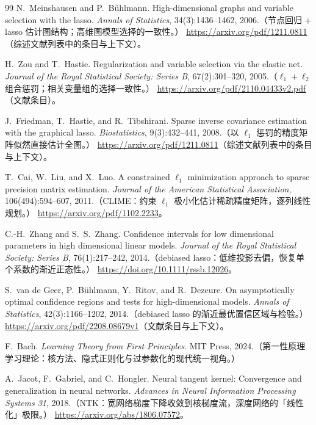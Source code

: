\documentclass[11pt, a4paper]{ctexart}
\theoremstyle{plain}
\theoremstyle{definition}
\theoremstyle{remark}
\begin{document}
\begin{thebibliography}{99}
N.~Meinshausen and P.~B\"uhlmann.
\newblock High-dimensional graphs and variable selection with the lasso.
\newblock \emph{Annals of Statistics}, 34(3):1436--1462, 2006.（节点回归 + lasso 估计图结构；高维图模型选择的一致性。）
\newblock \url{https://arxiv.org/pdf/1211.0811}（综述文献列表中的条目与上下文）。

H.~Zou and T.~Hastie.
\newblock Regularization and variable selection via the elastic net.
\newblock \emph{Journal of the Royal Statistical Society: Series B}, 67(2):301--320, 2005.（$\ell_1 + \ell_2$ 组合惩罚；相关变量组的选择一致性。）
\newblock \url{https://arxiv.org/pdf/2110.04433v2.pdf}（文献条目）。

J.~Friedman, T.~Hastie, and R.~Tibshirani.
\newblock Sparse inverse covariance estimation with the graphical lasso.
\newblock \emph{Biostatistics}, 9(3):432--441, 2008.（以 $\ell_1$ 惩罚的精度矩阵似然直接估计全图。）
\newblock \url{https://arxiv.org/pdf/1211.0811}（综述文献列表中的条目与上下文）。

T.~Cai, W.~Liu, and X.~Luo.
\newblock A constrained $\ell_1$ minimization approach to sparse precision matrix estimation.
\newblock \emph{Journal of the American Statistical Association}, 106(494):594--607, 2011.（CLIME：约束 $\ell_1$ 极小化估计稀疏精度矩阵，逐列线性规划。）
\newblock \url{https://arxiv.org/pdf/1102.2233}。

C.-H.~Zhang and S.~S.~Zhang.
\newblock Confidence intervals for low dimensional parameters in high dimensional linear models.
\newblock \emph{Journal of the Royal Statistical Society: Series B}, 76(1):217--242, 2014.（debiased lasso：低维投影去偏，恢复单个系数的渐近正态性。）
\newblock \url{https://doi.org/10.1111/rssb.12026}。

S.~van de Geer, P.~B\"uhlmann, Y.~Ritov, and R.~Dezeure.
\newblock On asymptotically optimal confidence regions and tests for high-dimensional models.
\newblock \emph{Annals of Statistics}, 42(3):1166--1202, 2014.（debiased lasso 的渐近最优置信区域与检验。）
\newblock \url{https://arxiv.org/pdf/2208.08679v1}（文献条目与上下文）。

F.~Bach.
\newblock \emph{Learning Theory from First Principles}.
\newblock MIT Press, 2024.（第一性原理学习理论：核方法、隐式正则化与过参数化的现代统一视角。）

A.~Jacot, F.~Gabriel, and C.~Hongler.
\newblock Neural tangent kernel: Convergence and generalization in neural networks.
\newblock \emph{Advances in Neural Information Processing Systems 31}, 2018.（NTK：宽网络梯度下降收敛到核梯度流，深度网络的「线性化」极限。）
\newblock \url{https://arxiv.org/abs/1806.07572}。


\end{thebibliography}
\end{document}
